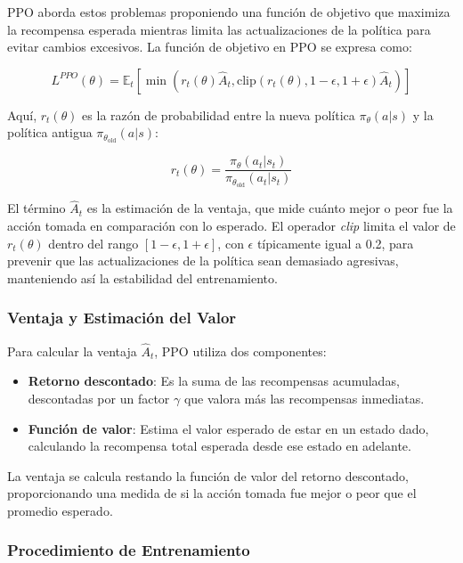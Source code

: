 \documentclass[a4paper,12pt, twoside]{report}
\begin{document}
PPO aborda estos problemas proponiendo una función de objetivo que maximiza la recompensa 
esperada mientras limita las actualizaciones de la política para evitar cambios excesivos. 
La función de objetivo en PPO se expresa como:

\[
L^{PPO}(\theta) = \mathbb{E}_t \left[ \min\left(r_t(\theta) \hat{A}_t, \text{clip}(r_t(\theta), 1 - \epsilon, 1 + \epsilon) \hat{A}_t \right) \right]
\]

Aquí, \( r_t(\theta) \) es la razón de probabilidad entre la nueva política \(\pi_\theta(a|s)\) 
y la política antigua \(\pi_{\theta_{\text{old}}}(a|s)\):

\[
r_t(\theta) = \frac{\pi_\theta(a_t|s_t)}{\pi_{\theta_{\text{old}}}(a_t|s_t)}
\]

El término \(\hat{A}_t\) es la estimación de la ventaja, que mide cuánto mejor o peor fue la 
acción tomada en comparación con lo esperado. El operador \textit{clip} limita el valor de 
\(r_t(\theta)\) dentro del rango \([1 - \epsilon, 1 + \epsilon]\), con \(\epsilon\) típicamente 
igual a 0.2, para prevenir que las actualizaciones de la política sean demasiado agresivas,
manteniendo así la estabilidad del entrenamiento.

\subsubsection{Ventaja y Estimación del Valor}

Para calcular la ventaja \(\hat{A}_t\), PPO utiliza dos componentes:

\begin{itemize}
    \item \textbf{Retorno descontado}: Es la suma de las recompensas acumuladas, descontadas 
    por un factor \(\gamma\) que valora más las recompensas inmediatas.
    \item \textbf{Función de valor}: Estima el valor esperado de estar en un estado dado, 
    calculando la recompensa total esperada desde ese estado en adelante.
\end{itemize}

La ventaja se calcula restando la función de valor del retorno descontado, proporcionando 
una medida de si la acción tomada fue mejor o peor que el promedio esperado.

\subsubsection{Procedimiento de Entrenamiento}
\end{document}
